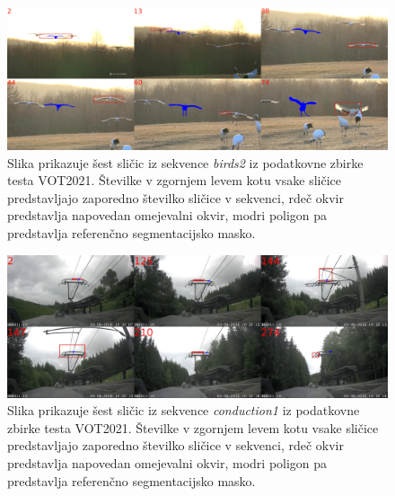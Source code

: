 \documentclass[a4paper,12pt,openright]{book}
\begin{document}
\begin{figure}[htb]
    \begin{center}
        \includegraphics[width=1\textwidth]{img/tracking_birds2.png}
    \end{center}
    \caption{Slika prikazuje šest sličic iz sekvence \emph{birds2} iz podatkovne zbirke testa VOT2021. Številke v zgornjem levem kotu vsake sličice predstavljajo zaporedno številko sličice v sekvenci, rdeč okvir predstavlja napovedan omejevalni okvir, modri poligon pa predstavlja referenčno segmentacijsko masko.}
    \label{img:birds2}
\end{figure}

\begin{figure}[htb]
    \begin{center}
        \includegraphics[width=1\textwidth]{img/conduction1.png}
    \end{center}
    \caption{Slika prikazuje šest sličic iz sekvence \emph{conduction1} iz podatkovne zbirke testa VOT2021. Številke v zgornjem levem kotu vsake sličice predstavljajo zaporedno številko sličice v sekvenci, rdeč okvir predstavlja napovedan omejevalni okvir, modri poligon pa predstavlja referenčno segmentacijsko masko.}
    \label{img:conduction1}
\end{figure}

\end{document}
